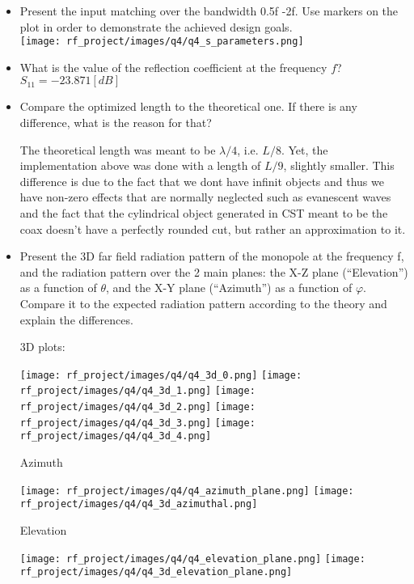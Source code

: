 \documentclass[12pt, letterpaper]{article}
\begin{document}
\begin{itemize}
  \item Present the input matching over the bandwidth 0.5f -2f. Use markers on the plot in order to demonstrate the achieved design goals.
  \\
  \texttt{[image: rf\_project/images/q4/q4\_s\_parameters.png]}
  \item What is the value of the reflection coefficient at the frequency $f$?
  \\
  {\color{red}$S_{11}=-23.871[dB]$}
  \item Compare the optimized length to the theoretical one. If there is any difference, what is the reason for that?

  {\color{blue}The theoretical length was meant to be $\lambda/4$, i.e. $L/8$. Yet, the implementation above was done with a length of $L/9$, slightly smaller. This difference is due to the fact that we dont have infinit objects and thus we have non-zero effects that are normally neglected such as evanescent waves and the fact that the cylindrical object generated in CST meant to be the coax doesn't have a perfectly rounded cut, but rather an approximation to it.}
  \item Present the 3D far field radiation pattern of the monopole at the frequency f, and the radiation pattern over the 2 main planes: the X-Z plane (“Elevation”) as a function of $\theta$, and the X-Y plane (“Azimuth”) as a function of $\varphi$. Compare it to the expected radiation pattern according to the theory and explain the differences.
  \pagebreak
  \begin{center}
    3D plots:
  \end{center}
  \texttt{[image: rf\_project/images/q4/q4\_3d\_0.png]}
  \texttt{[image: rf\_project/images/q4/q4\_3d\_1.png]}
  \texttt{[image: rf\_project/images/q4/q4\_3d\_2.png]}
  \texttt{[image: rf\_project/images/q4/q4\_3d\_3.png]}
  \texttt{[image: rf\_project/images/q4/q4\_3d\_4.png]}

  \begin{center}
    Azimuth
  \end{center}
  \texttt{[image: rf\_project/images/q4/q4\_azimuth\_plane.png]}
  \texttt{[image: rf\_project/images/q4/q4\_3d\_azimuthal.png]}


  \begin{center}
    Elevation
  \end{center}
  \texttt{[image: rf\_project/images/q4/q4\_elevation\_plane.png]}
  \texttt{[image: rf\_project/images/q4/q4\_3d\_elevation\_plane.png]}


\end{itemize}
\end{document}
